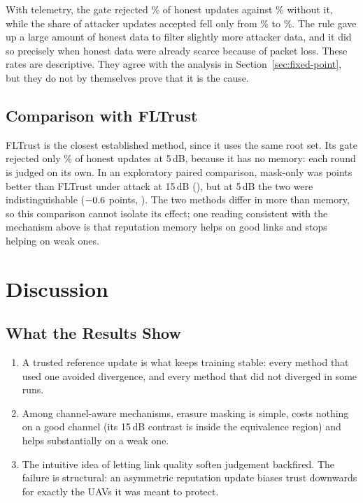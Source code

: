 With telemetry, the gate rejected \RejCcra\% of honest updates against \RejMask\%
without it, while the share of attacker updates accepted fell only from \AccptMask\%
to \AccptCcra\%. The rule gave up a large amount of honest data to filter slightly
more attacker data, and it did so precisely when honest data were already scarce
because of packet loss. These rates are descriptive. They agree with the analysis in
Section~\ref{sec:fixed-point}, but they do not by themselves prove that it is the
cause.

\subsection{Comparison with FLTrust}
FLTrust is the closest established method, since it uses the same root set. Its gate
rejected only \RejFltrust\% of honest updates at 5\,dB, because it has no memory:
each round is judged on its own. In an exploratory paired comparison, mask-only was
\VsFltTrace{} points better than FLTrust under attack at 15\,dB
(\ci{\VsFltTraceLo}{\VsFltTraceHi}), but at 5\,dB the two were indistinguishable
($-0.6$ points, \ci{\VsFltStressLo}{\VsFltStressHi}). The two methods differ
in more than memory, so this comparison cannot isolate its effect; one reading
consistent with the mechanism above is that reputation memory helps on good links and
stops helping on weak ones.

\section{Discussion}
\subsection{What the Results Show}
\begin{enumerate}
\item A trusted reference update is what keeps training stable: every method that
  used one avoided divergence, and every method that did not diverged in some runs.
\item Among channel-aware mechanisms, erasure masking is simple, costs nothing on a
  good channel (its 15\,dB contrast is inside the equivalence region) and helps
  substantially on a weak one.
\item The intuitive idea of letting link quality soften judgement backfired. The
  failure is structural: an asymmetric reputation update biases trust downwards for
  exactly the UAVs it was meant to protect.
\end{enumerate}

